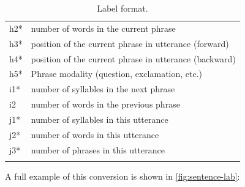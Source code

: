 \begin{longtable}[!htpb]{p{} p{}}
\toprule
h2* & number of words in the current phrase \\
h3* & position of the current phrase in utterance (forward) \\
h4* & position of the current phrase in utterance (backward) \\
h5* & Phrase modality (question, exclamation, etc.)\\
\midrule
i1* & number of syllables in the next phrase \\
i2 & number of words in the previous phrase \\
\midrule
j1* & number of syllables in this utterance \\
j2* & number of words in this utterance \\
j3* & number of phrases in this utterance \\
\bottomrule
\caption{\label{table:lab_format}Label format.}\\
\end{longtable}
\doublespacing


A full example of this conversion is shown in \ref{fig:sentence-lab}:

